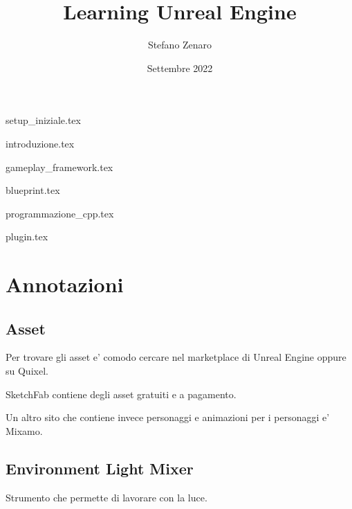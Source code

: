 \documentclass{book}
\author{Stefano Zenaro}
\date{Settembre 2022}
\title{Learning Unreal Engine}
\begin{document}

    \maketitle
    \newpage

    \tableofcontents


    {setup_iniziale.tex}


    {introduzione.tex}


    {gameplay_framework.tex}


    {blueprint.tex}


    {programmazione_cpp.tex}


    {plugin.tex}



    \chapter{Annotazioni}

    \section{Asset}
        Per trovare gli asset e' comodo cercare nel marketplace di Unreal Engine oppure su Quixel.

        SketchFab contiene degli asset gratuiti e a pagamento.

        Un altro sito che contiene invece personaggi e animazioni per i personaggi e' Mixamo.

    \section{Environment Light Mixer}
        Strumento che permette di lavorare con la luce.
\end{document}
